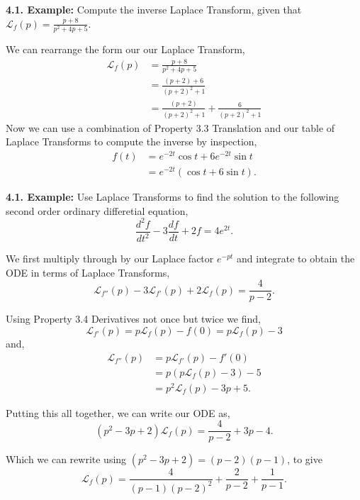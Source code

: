 \documentclass[11pt]{article}
\begin{document}
\textbf{4.1. Example:} Compute the inverse Laplace Transform, given that $\mathcal{L}_f (p) = \frac{p+8}{p^2 + 4p + 5}$.

We can rearrange the form our our Laplace Transform,
\begin{align*}
    \mathcal{L}_f (p) &= \frac{p+8}{p^2 +4p +5} \\
    &= \frac{(p+2) + 6}{(p+2)^2 + 1} \\
    & = \frac{(p+2)}{(p+2)^2 +1} + \frac{6}{(p+2)^2 + 1}
\end{align*}
Now we can use a combination of Property 3.3 Translation and our table of Laplace Transforms to compute the inverse by inspection,
\begin{align*}
    f(t) &= e^{-2t}\cos t + 6e^{-2t} \sin t \\
    &= e^{-2t} (\cos t + 6\sin t).
\end{align*}

\textbf{4.1. Example:} Use Laplace Transforms to find the solution to the following second order ordinary differetial equation,
\begin{equation*}
    \frac{d^2f}{dt^2} - 3\frac{df}{dt} + 2f = 4e^{2t}.
\end{equation*}

We first multiply through by our Laplace factor $e^{-pt}$ and integrate to obtain the ODE in terms of Laplace Transforms,
\begin{equation*}
    \mathcal{L}_{f''} (p) - 3 \mathcal{L}_{f'} (p) + 2 \mathcal{L}_f (p) = \frac{4}{p-2}.
\end{equation*}

Using Property 3.4 Derivatives not once but twice we find,
\begin{equation*}
    \mathcal{L}_{f'} (p) = p \mathcal{L}_{f} (p) - f(0) = p \mathcal{L}_{f} (p) - 3
\end{equation*}
and,
\begin{align*}
    \mathcal{L}_{f''} (p) &= p \mathcal{L}_{f'} (p) - f'(0) \\
    &= p \left( p \mathcal{L}_{f} (p) - 3 \right) - 5 \\
    &= p^2 \mathcal{L}_f (p) -3p +5. 
\end{align*}

Putting this all together, we can write our ODE as,
\begin{equation*}
    (p^2 -3p + 2) \mathcal{L}_f (p) = \frac{4}{p-2} + 3p - 4.
\end{equation*}

Which we can rewrite using $(p^2 -3p + 2) = (p-2)(p-1)$, to give
\begin{equation*}
     \mathcal{L}_f (p) = \frac{4}{(p-1)(p-2)^2} + \frac{2}{p-2} + \frac{1}{p-1}.
\end{equation*}
\end{document}
